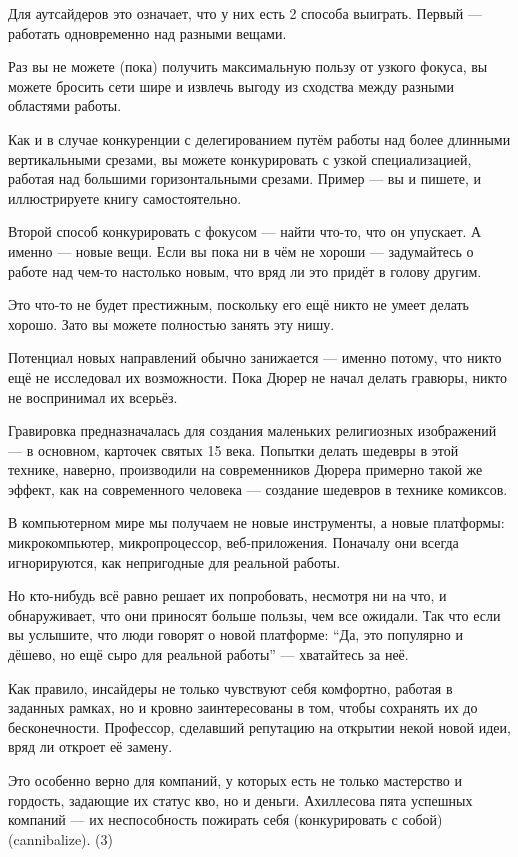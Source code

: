 \documentclass[ebook,12pt,oneside,openany]{memoir}
\begin{document}
Для аутсайдеров это означает, что у них есть 2 способа выиграть.
Первый — работать одновременно над разными вещами.

Раз вы не можете (пока) получить максимальную пользу от узкого фокуса,
вы можете бросить сети шире и извлечь выгоду из сходства между разными
областями работы.

Как и в случае конкуренции с делегированием путём работы над более
длинными вертикальными срезами, вы можете конкурировать с узкой
специализацией, работая над большими горизонтальными срезами. Пример —
вы и пишете, и иллюстрируете книгу самостоятельно.

Второй способ конкурировать с фокусом — найти что-то, что он упускает.
А именно — новые вещи. Если вы пока ни в чём не хороши — задумайтесь о
работе над чем-то настолько новым, что вряд ли это придёт в голову
другим.

Это что-то не будет престижным, поскольку его ещё никто не умеет
делать хорошо. Зато вы можете полностью занять эту нишу.

Потенциал новых направлений обычно занижается — именно потому, что
никто ещё не исследовал их возможности. Пока Дюрер не начал делать
гравюры, никто не воспринимал их всерьёз.

Гравировка предназначалась для создания маленьких религиозных
изображений — в основном, карточек святых 15 века. Попытки делать
шедевры в этой технике, наверно, производили на современников Дюрера
примерно такой же эффект, как на современного человека — создание
шедевров в технике комиксов.

В компьютерном мире мы получаем не новые инструменты, а новые
платформы: микрокомпьютер, микропроцессор, веб-приложения. Поначалу
они всегда игнорируются, как непригодные для реальной работы.

Но кто-нибудь всё равно решает их попробовать, несмотря ни на что, и
обнаруживает, что они приносят больше пользы, чем все ожидали. Так что
если вы услышите, что люди говорят о новой платформе: “Да, это
популярно и дёшево, но ещё сыро для реальной работы” — хватайтесь за
неё.

Как правило, инсайдеры не только чувствуют себя комфортно, работая в
заданных рамках, но и кровно заинтересованы в том, чтобы сохранять их
до бесконечности. Профессор, сделавший репутацию на открытии некой
новой идеи, вряд ли откроет её замену.

Это особенно верно для компаний, у которых есть не только мастерство и
гордость, задающие их статус кво, но и деньги. Ахиллесова пята
успешных компаний — их неспособность пожирать себя (конкурировать с
собой) (cannibalize). (3)
\end{document}
